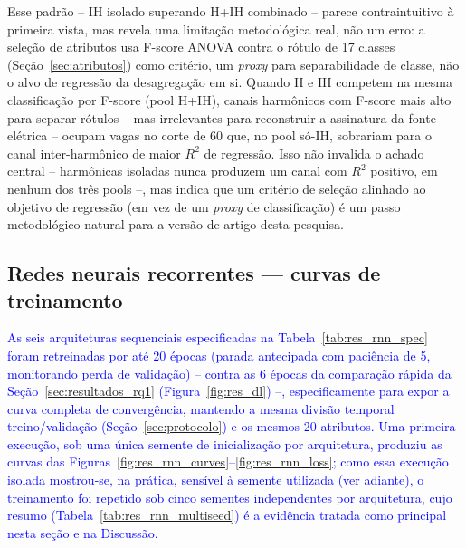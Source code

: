 \documentclass[times,final]{elsarticle}
\begin{document}
{Esse padrão -- IH isolado superando H+IH combinado -- parece contraintuitivo à primeira vista, mas revela uma limitação metodológica real, não um erro: a seleção de atributos usa F-score ANOVA contra o rótulo de 17 classes (Seção~\ref{sec:atributos}) como critério, um \textit{proxy} para separabilidade de classe, não o alvo de regressão da desagregação em si. Quando H e IH competem na mesma classificação por F-score (pool H+IH), canais harmônicos com F-score mais alto para separar rótulos -- mas irrelevantes para reconstruir a assinatura da fonte elétrica -- ocupam vagas no corte de 60 que, no pool só-IH, sobrariam para o canal inter-harmônico de maior $R^2$ de regressão. Isso não invalida o achado central -- harmônicas isoladas nunca produzem um canal com $R^2$ positivo, em nenhum dos três pools --, mas indica que um critério de seleção alinhado ao objetivo de regressão (em vez de um \textit{proxy} de classificação) é um passo metodológico natural para a versão de artigo desta pesquisa.
}

\subsection{Redes neurais recorrentes --- curvas de treinamento}
\label{sec:resultados_rnn}

\textcolor{blue}{As seis arquiteturas sequenciais especificadas na Tabela~\ref{tab:res_rnn_spec} foram retreinadas por até 20 épocas (parada antecipada com paciência de 5, monitorando perda de validação) -- contra as 6 épocas da comparação rápida da Seção~\ref{sec:resultados_rq1} (Figura~\ref{fig:res_dl}) --, especificamente para expor a curva completa de convergência, mantendo a mesma divisão temporal treino/validação (Seção~\ref{sec:protocolo}) e os mesmos 20 atributos. Uma primeira execução, sob uma única semente de inicialização por arquitetura, produziu as curvas das Figuras~\ref{fig:res_rnn_curves}--\ref{fig:res_rnn_loss}; como essa execução isolada mostrou-se, na prática, sensível à semente utilizada (ver adiante), o treinamento foi repetido sob cinco sementes independentes por arquitetura, cujo resumo (Tabela~\ref{tab:res_rnn_multiseed}) é a evidência tratada como principal nesta seção e na Discussão.}
\end{document}
